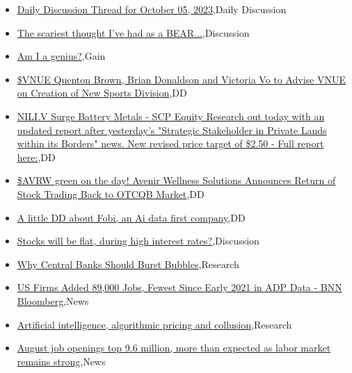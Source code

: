 \documentclass{article}%
\begin{document}
%
\begin{itemize}%
\item%
\href{https://reddit.com/r/wallstreetbets/comments/170e0ih/daily\_discussion\_thread\_for\_october\_05\_2023/}{Daily Discussion Thread for October 05, 2023},Daily Discussion%
\item%
\href{https://reddit.com/r/wallstreetbets/comments/1708dvs/the\_scariest\_thought\_ive\_had\_as\_a\_bear/}{The scariest thought I've had as a BEAR...},Discussion%
\item%
\href{https://reddit.com/r/wallstreetbets/comments/1705zih/am\_i\_a\_genius/}{Am I a genius?},Gain%
\item%
\href{https://reddit.com/r/Baystreetbets/comments/16zvmc9/vnue\_quenton\_brown\_brian\_donaldson\_and\_victoria/}{\$VNUE Quenton Brown, Brian Donaldson and Victoria Vo to Advise VNUE on Creation of New Sports Division},DD%
\item%
\href{https://reddit.com/r/Baystreetbets/comments/16zuz0f/niliv\_surge\_battery\_metals\_scp\_equity\_research/}{NILI.V Surge Battery Metals - SCP Equity Research out today with an updated report after yesterday's "Strategic Stakeholder in Private Lands within its Borders" news. New revised price target of \$2.50 - Full report here:},DD%
\item%
\href{https://reddit.com/r/Baystreetbets/comments/16zt70k/avrw\_green\_on\_the\_day\_avenir\_wellness\_solutions/}{\$AVRW green on the day! Avenir Wellness Solutions Announces Return of Stock Trading Back to OTCQB Market},DD%
\item%
\href{https://reddit.com/r/Baystreetbets/comments/16zqzpk/a\_little\_dd\_about\_fobi\_an\_ai\_data\_first\_company/}{A little DD about Fobi, an Ai data first company},DD%
\item%
\href{https://reddit.com/r/StockMarket/comments/1703ggk/stocks\_will\_be\_flat\_during\_high\_interest\_rates/}{Stocks will be flat, during high interest rates?},Discussion%
\item%
\href{https://reddit.com/r/Economics/comments/170028y/why\_central\_banks\_should\_burst\_bubbles/}{Why Central Banks Should Burst Bubbles},Research%
\item%
\href{https://reddit.com/r/Economics/comments/16zo3ea/us\_firms\_added\_89000\_jobs\_fewest\_since\_early\_2021/}{US Firms Added 89,000 Jobs, Fewest Since Early 2021 in ADP Data - BNN Bloomberg},News%
\item%
\href{https://reddit.com/r/Economics/comments/16zlvl4/artificial\_intelligence\_algorithmic\_pricing\_and/}{Artificial intelligence, algorithmic pricing and collusion},Research%
\item%
\href{https://reddit.com/r/Economics/comments/16zkjyz/august\_job\_openings\_top\_96\_million\_more\_than/}{August job openings top 9.6 million, more than expected as labor market remains strong},News%
\end{itemize}%
\end{document}
